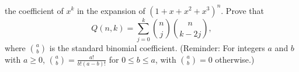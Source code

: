 the coefficient of $x^k$ in the expansion of $(1 + x + x^2 + x^3)^n$.
Prove that
\[
Q(n, k) = \sum_{j=0}^k \binom{n}{j} \binom{n}{k-2j},
\]
where $\binom{a}{b}$ is the standard binomial coefficient. (Reminder: For
integers $a$ and $b$ with $a \geq 0$, $\binom{a}{b} =
\frac{a!}{b!(a-b)!}$ for $0 \leq b \leq a$, with $\binom{a}{b} = 0$ otherwise.)
